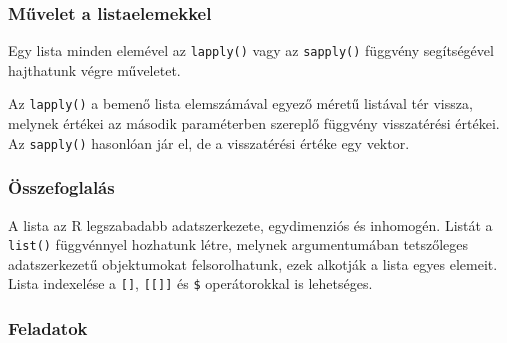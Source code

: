 \documentclass[
]{book}
\makeatletter
\newenvironment{Shaded}{\begin{snugshade}}{\end{snugshade}}
\newcommand{\AttributeTok}[1]{\textcolor[rgb]{0.77,0.63,0.00}{#1}}
\newcommand{\CommentTok}[1]{\textcolor[rgb]{0.56,0.35,0.01}{\textit{#1}}}
\newcommand{\FunctionTok}[1]{\textcolor[rgb]{0.00,0.00,0.00}{#1}}
\newcommand{\NormalTok}[1]{#1}
\newenvironment{kframe}{%
\medskip{}
\setlength{\fboxsep}{.8em}
 \def\at@end@of@kframe{}%
 \ifinner\ifhmode%
  \def\at@end@of@kframe{\end{minipage}}%
  \begin{minipage}{\columnwidth}%
 \fi\fi%
 \def\FrameCommand##1{\hskip\@totalleftmargin \hskip-\fboxsep
 \colorbox{shadecolor}{##1}\hskip-\fboxsep
     \hskip-\linewidth \hskip-\@totalleftmargin \hskip\columnwidth}%
 \MakeFramed {\advance\hsize-\width
   \@totalleftmargin\z@ \linewidth\hsize
   \@setminipage}}%
 {\par\unskip\endMakeFramed%
 \at@end@of@kframe}
\newenvironment{rmdblock}[1]
  {
  \begin{itemize}
  \renewcommand{\labelitemi}{
    \raisebox{-.7\height}[0pt][0pt]{
      {\setkeys{Gin}{width=3em,keepaspectratio}\texttt{[image: images/\#1]}}
    }
  }
  \setlength{\fboxsep}{1em}
  \begin{kframe}
  \item
  }
  {
  \end{kframe}
  \end{itemize}
  }
\newenvironment{rmdsummary}
  {\begin{rmdblock}{summary}}
  {\end{rmdblock}}
\makeatother
\begin{document}
\hypertarget{mux171velet-a-listaelemekkel}{%
\subsubsection{Művelet a listaelemekkel}\label{mux171velet-a-listaelemekkel}}

Egy lista minden elemével az \texttt{lapply()} vagy az \texttt{sapply()} függvény segítségével hajthatunk végre műveletet.

\begin{Shaded}
\end{Shaded}

Az \texttt{lapply()} a bemenő lista elemszámával egyező méretű listával tér vissza, melynek értékei az második paraméterben szereplő függvény visszatérési értékei. Az \texttt{sapply()} hasonlóan jár el, de a visszatérési értéke egy vektor.

\hypertarget{az-r-nyelv-8-summary}{%
\subsubsection{Összefoglalás}\label{az-r-nyelv-8-summary}}

\begin{rmdsummary}
A lista az R legszabadabb adatszerkezete, egydimenziós és inhomogén.
Listát a \texttt{list()} függvénnyel hozhatunk létre, melynek
argumentumában tetszőleges adatszerkezetű objektumokat felsorolhatunk,
ezek alkotják a lista egyes elemeit. Lista indexelése a \texttt{{[}{]}},
\texttt{{[}{[}{]}{]}} és \texttt{\$} operátorokkal is lehetséges.
\end{rmdsummary}

\hypertarget{az-r-nyelv-8-exercise}{%
\subsubsection{Feladatok}\label{az-r-nyelv-8-exercise}}
\end{document}
